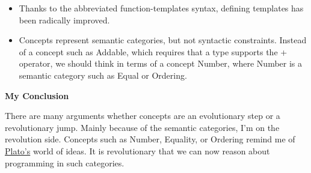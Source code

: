 \begin{tcolorbox}[colback=blue!5!white,colframe=blue!75!black,title=Regular Types]
\begin{itemize}
\item 
Thanks to the abbreviated function-templates syntax, defining templates has been radically improved.

\item 
Concepts represent semantic categories, but not syntactic constraints. Instead of a concept such as Addable, which requires that a type supports the + operator, we should think in terms of a concept Number, where Number is a semantic category such as Equal or Ordering.
\end{itemize}

\noindent
\textbf{My Conclusion}

There are many arguments whether concepts are an evolutionary step or a revolutionary jump. Mainly because of the semantic categories, I’m on the revolution side. Concepts such as Number, Equality, or Ordering remind me of \href{https://en.wikipedia.org/wiki/Plato}{Plato’s} world of ideas. It is revolutionary that we can now reason about programming in such categories.
\end{tcolorbox}

